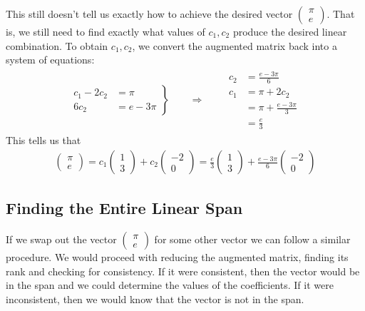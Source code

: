 \documentclass[11pt]{article}
\begin{document}
This still doesn't tell us exactly how to achieve the desired vector $\begin{pmatrix}\pi \\ e\end{pmatrix}$. That is, we still need to find exactly what values of $c_1, c_2$ produce the desired linear combination. To obtain $c_1,c_2$, we convert the augmented matrix back into a system of equations:
\begin{align*}
\left.
\begin{aligned}
c_1 - 2 c_2 &= \pi
\\
6 c_2 &= e - 3\pi
\end{aligned}
\right\}
\qquad
\Longrightarrow
\qquad
\begin{aligned}
c_2 &= \frac{e - 3\pi}{6}
\\
c_1 &= \pi + 2 c_2
\\
&= \pi + \frac{e-3\pi}{3}
\\
&= \frac{e}{3}
\end{aligned}
\end{align*}
This tells us that
\begin{align*}
\begin{pmatrix}\pi\\e\end{pmatrix}
= c_1 \begin{pmatrix}1\\3\end{pmatrix} + c_2 \begin{pmatrix}-2\\0\end{pmatrix}
= \frac{e}{3} \begin{pmatrix}1\\3\end{pmatrix} + \frac{e - 3\pi}{6} \begin{pmatrix}-2\\0\end{pmatrix}
\end{align*}

\subsection*{Finding the Entire Linear Span}

If we swap out the vector $\begin{pmatrix}\pi\\e\end{pmatrix}$ for some other vector we can follow a similar procedure. We would proceed with reducing the augmented matrix, finding its rank and checking for consistency. If it were consistent, then the vector would be in the span and we could determine the values of the coefficients. If it were inconsistent, then we would know that the vector is not in the span.
\end{document}
